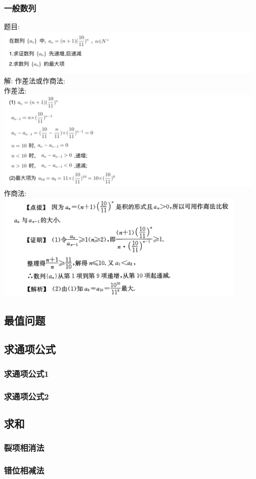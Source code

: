 \documentclass[hyperref, UTF8,11pt,a4paper]{ctexart} %
\begin{document}
\subsubsection{一般数列}
{\color{red}  题目: } \\
\includegraphics[width=500pt]  {pic/shulie/yibandandiaoxingtimu.jpg} \\
解: {\color{blue}  作差法或作商法: }\\
作差法: \\
\includegraphics[width=500pt]  {pic/shulie/yibandandiaoxingdaan1.jpg} \\
作商法: \\
\includegraphics[width=350pt]  {pic/shulie/yibandandiaoxingdaan2.jpg} \\


\subsection{最值问题}
\subsection{求通项公式}
\subsubsection{求通项公式1}
\subsubsection{求通项公式2}
\subsection{求和}
\subsubsection{裂项相消法}
\subsubsection{错位相减法}
\end{document}

